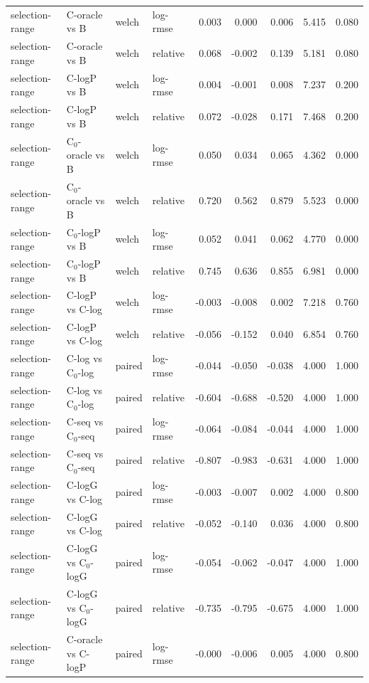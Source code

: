 \begin{longtable}{llllrrrrr}
selection-range & C-oracle vs B & welch & log-rmse & 0.003 & 0.000 & 0.006 & 5.415 & 0.080 \\
selection-range & C-oracle vs B & welch & relative & 0.068 & -0.002 & 0.139 & 5.181 & 0.080 \\
selection-range & C-logP vs B & welch & log-rmse & 0.004 & -0.001 & 0.008 & 7.237 & 0.200 \\
selection-range & C-logP vs B & welch & relative & 0.072 & -0.028 & 0.171 & 7.468 & 0.200 \\
selection-range & C$_0$-oracle vs B & welch & log-rmse & 0.050 & 0.034 & 0.065 & 4.362 & 0.000 \\
selection-range & C$_0$-oracle vs B & welch & relative & 0.720 & 0.562 & 0.879 & 5.523 & 0.000 \\
selection-range & C$_0$-logP vs B & welch & log-rmse & 0.052 & 0.041 & 0.062 & 4.770 & 0.000 \\
selection-range & C$_0$-logP vs B & welch & relative & 0.745 & 0.636 & 0.855 & 6.981 & 0.000 \\
selection-range & C-logP vs C-log & welch & log-rmse & -0.003 & -0.008 & 0.002 & 7.218 & 0.760 \\
selection-range & C-logP vs C-log & welch & relative & -0.056 & -0.152 & 0.040 & 6.854 & 0.760 \\
selection-range & C-log vs C$_0$-log & paired & log-rmse & -0.044 & -0.050 & -0.038 & 4.000 & 1.000 \\
selection-range & C-log vs C$_0$-log & paired & relative & -0.604 & -0.688 & -0.520 & 4.000 & 1.000 \\
selection-range & C-seq vs C$_0$-seq & paired & log-rmse & -0.064 & -0.084 & -0.044 & 4.000 & 1.000 \\
selection-range & C-seq vs C$_0$-seq & paired & relative & -0.807 & -0.983 & -0.631 & 4.000 & 1.000 \\
selection-range & C-logG vs C-log & paired & log-rmse & -0.003 & -0.007 & 0.002 & 4.000 & 0.800 \\
selection-range & C-logG vs C-log & paired & relative & -0.052 & -0.140 & 0.036 & 4.000 & 0.800 \\
selection-range & C-logG vs C$_0$-logG & paired & log-rmse & -0.054 & -0.062 & -0.047 & 4.000 & 1.000 \\
selection-range & C-logG vs C$_0$-logG & paired & relative & -0.735 & -0.795 & -0.675 & 4.000 & 1.000 \\
selection-range & C-oracle vs C-logP & paired & log-rmse & -0.000 & -0.006 & 0.005 & 4.000 & 0.800 \\

\end{longtable}
